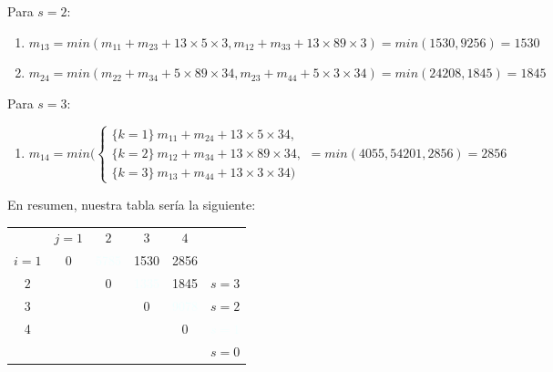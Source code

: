 \documentclass[10pt,a4paper,spanish]{report}
\theoremstyle{definition}
\theoremstyle{remark}
\begin{document}
\begin{description}
\begin{enumerate}[\color{amethyst}{$\heartsuit$}]
        Para $s=2$:
        \begin{enumerate}[$\longrightarrow$]
            \item $m_{13} = min(m_{11} + m_{23} + 13 \times 5 \times 3, m_{12} + m_{33} + 13 \times 89 \times 3) = min(1530, 9256) = 1530$
            \item $m_{24} = min(m_{22} + m_{34} + 5 \times 89 \times 34, m_{23} + m_{44} + 5 \times 3 \times 34) = min(24208, 1845) = 1845$
        \end{enumerate}

        Para $s=3$:
        \begin{enumerate}[$\longrightarrow$]
            \item         
                \begin{equation*}
                m_{14} = min(
                \begin{cases}
                \{k=1\} ~ m_{11} + m_{24} + 13 \times 5 \times 34, \\
                \{k=2\} ~ m_{12} + m_{34} + 13 \times 89 \times 34, \\
                \{k=3\} ~ m_{13} + m_{44} + 13 \times 3 \times 34)
                \end{cases}
                = min (4055, 54201, 2856) = 2856
                \end{equation*}
        \end{enumerate}
    \end{enumerate}

    En resumen, nuestra tabla sería la siguiente:

    \begin{tabular}{c | c c c c l}
    & $j=1$ & $2$ & $3$ & $4$ & \\
    \cline{1-5}
    $i = 1$ &\textcolor{armygreen}{0} & \textcolor{azure}{5785} & \textcolor{coquelicot}{1530} & \textcolor{electricgreen}{2856} & \\
    $2$ & & \textcolor{armygreen}{0} & \textcolor{azure}{1335} & \textcolor{coquelicot}{1845} &  \textcolor{electricgreen}{$s=3$} \\
    $3$ & & & \textcolor{armygreen}{0} & \textcolor{azure}{9078} &  \textcolor{coquelicot}{$s=2$} \\
    4 & & & & \textcolor{armygreen}{0} &  \textcolor{azure}{$s=1$} \\
    & & & & & \textcolor{armygreen}{$s=0$} \\
    \end{tabular}
\end{description}
\end{document}
